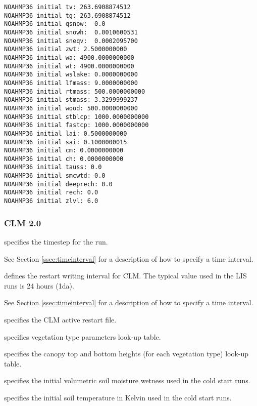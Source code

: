 \begin{Verbatim}[frame=single]
NOAHMP36 initial tv: 263.6908874512    
NOAHMP36 initial tg: 263.6908874512    
NOAHMP36 initial qsnow:  0.0    
NOAHMP36 initial snowh:  0.0010600531    
NOAHMP36 initial sneqv:  0.0002095700    
NOAHMP36 initial zwt: 2.5000000000    
NOAHMP36 initial wa: 4900.0000000000    
NOAHMP36 initial wt: 4900.0000000000    
NOAHMP36 initial wslake: 0.0000000000    
NOAHMP36 initial lfmass: 9.0000000000    
NOAHMP36 initial rtmass: 500.0000000000    
NOAHMP36 initial stmass: 3.3299999237    
NOAHMP36 initial wood: 500.0000000000    
NOAHMP36 initial stblcp: 1000.0000000000    
NOAHMP36 initial fastcp: 1000.0000000000    
NOAHMP36 initial lai: 0.5000000000    
NOAHMP36 initial sai: 0.1000000015    
NOAHMP36 initial cm: 0.0000000000    
NOAHMP36 initial ch: 0.0000000000    
NOAHMP36 initial tauss: 0.0    
NOAHMP36 initial smcwtd: 0.0 
NOAHMP36 initial deeprech: 0.0    
NOAHMP36 initial rech: 0.0    
NOAHMP36 initial zlvl: 6.0  
 \end{Verbatim}





 
 \subsubsection{CLM 2.0} \label{sssec:lsm_clm2}
 

 
  specifies the timestep for the run.

 See Section \ref{ssec:timeinterval} for a description
 of how to specify a time interval.

  defines the restart
 writing interval for CLM. The typical value used in the
 LIS runs is 24 hours (1da).

 See Section \ref{ssec:timeinterval} for a description
 of how to specify a time interval.

  specifies the CLM active restart file.

  specifies vegetation type
 parameters look-up table.

  specifies the canopy top and
 bottom heights (for each vegetation type) look-up table.

  specifies the initial volumetric
 soil moisture wetness used in the cold start runs.

  specifies the initial soil
 temperature in Kelvin used in the cold start runs.

